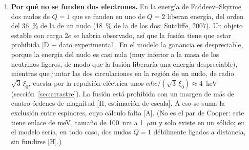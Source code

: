 \documentclass[11pt,a4paper]{article}
\newcommand{\st}[1]{\textup{[#1]}}
\begin{document}
\begin{enumerate}[label=\arabic*.,ref=\arabic*,leftmargin=*]
proporción a lo que la energía del nudo quede por debajo de 0,04~eV, y en el muonio desaparece la tensión que planteaba la estimación anterior. Se pierde así un contraste directo, a cambio de la predicción de los neutrinos de Dirac (punto~\ref{ab:leptonico}), que no depende de una escala estimada. Falta derivar las dos rigideces de las propiedades del esméctico. Se retiran la hipótesis $\ell\approx r_e$ y el argumento de compresión del nudo en los choques de versiones anteriores: el nudo no se acopla eléctricamente y los choques no lo ven (punto~\ref{ab:condiciones}).

\item \label{ab:fusion}\textbf{Por qué no se funden dos electrones.} En la energía de Faddeev--Skyrme dos nudos de $Q=1$ que se funden en uno de $Q=2$ liberan energía, del orden del 36~\% de la de un nudo (18~\% de la de los dos; Sutcliffe, 2007). Un objeto estable con carga $2e$ se habría observado, así que la fusión tiene que estar prohibida \st{D + dato experimental}. En el modelo la ganancia es despreciable, porque la energía del nudo es casi nula (muy inferior a la masa de los neutrinos ligeros, de modo que la fusión liberaría una energía despreciable), mientras que juntar las dos circulaciones en la región de un nudo, de radio $\sqrt3\,\xi_0$, cuesta por la repulsión eléctrica unos $\alpha\hbar c/(\sqrt3\,\xi_0)\approx4$~keV (sección~\ref{sec:arrastre}). La fusión está prohibida con un margen de más de cuatro órdenes de magnitud \st{H, estimación de escala}. A eso se suma la exclusión entre espinores, cuyo cálculo falta \st{A}. (No es el par de Cooper: este tiene enlace de meV, tamaño de 100~nm a 1~$\mu$m y solo existe en un sólido; en el modelo sería, en todo caso, dos nudos $Q=1$ débilmente ligados a distancia, sin fundirse \st{H}.)


\end{enumerate}
\end{document}
